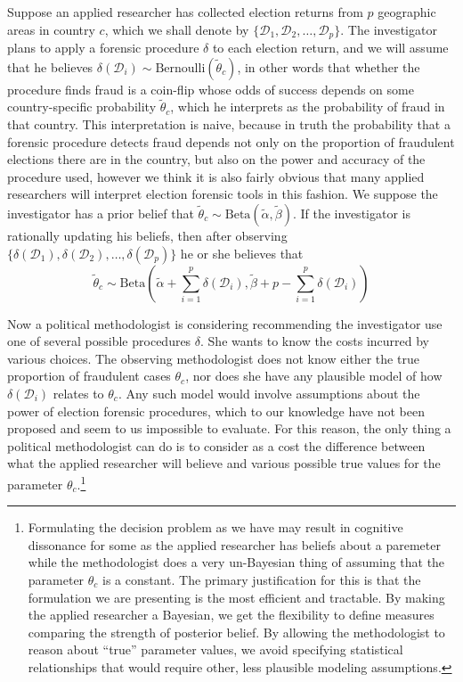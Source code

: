 Suppose an applied researcher has collected election returns from $p$ geographic areas in country $c$, which we shall denote by $\{\mathcal{D}_1,\mathcal{D}_2,\ldots,\mathcal{D}_p \}$.  The investigator plans to apply a forensic procedure $\delta$ to each election return, and we will assume that he believes $\delta(\mathcal{D}_i) \sim \textrm{Bernoulli}(\tilde{\theta}_c)$, in other words that whether the procedure finds fraud is a coin-flip whose odds of success depends on some country-specific probability $\tilde{\theta}_c$, which he interprets as the probability of fraud in that country. This interpretation is naive, because in truth the probability that a forensic procedure detects fraud depends not only on the proportion of fraudulent elections there are in the country, but also on the power and accuracy of the procedure used, however we think it is also fairly obvious that many applied researchers will interpret election forensic tools in this fashion. We suppose the investigator has a prior belief that $\tilde{\theta}_c \sim \textrm{Beta}(\tilde{\alpha},\tilde{\beta})$.  If the investigator is rationally updating his beliefs, then after observing $\{\delta(\mathcal{D}_1),\delta(\mathcal{D}_2),\ldots,\delta(\mathcal{D}_p) \}$ he or she believes that $$\tilde{\theta}_c \sim \textrm{Beta} \left(\tilde{\alpha}+\sum_{i=1}^p \delta(\mathcal{D}_i),\tilde{\beta}+p-\sum_{i=1}^p \delta(\mathcal{D}_i) \right)$$

Now a political methodologist is considering recommending the investigator use one of several possible procedures $\delta$. She wants to know the costs incurred by various choices. The observing methodologist does not know either the true proportion of fraudulent cases $\theta_c$, nor does she have any plausible model of how $\delta(\mathcal{D}_i)$ relates to $\theta_c$. Any such model would involve assumptions about the power of election forensic procedures, which to our knowledge have not been proposed and seem to us impossible to evaluate. For this reason, the only thing a political methodologist can do is to consider as a cost the difference between what the applied researcher will believe and various possible true values for the parameter $\theta_c$.\footnote{Formulating the decision problem as we have may result in cognitive dissonance for some as the applied researcher has beliefs about a paremeter while the methodologist does a very un-Bayesian thing of assuming that the parameter $\theta_c$ is a constant. The primary justification for this is that the formulation we are presenting is the most efficient and tractable. By making the applied researcher a Bayesian, we get the flexibility to define measures comparing the strength of posterior belief.  By allowing the methodologist to reason about ``true'' parameter values, we avoid specifying statistical relationships that would require other, less plausible modeling assumptions.}

